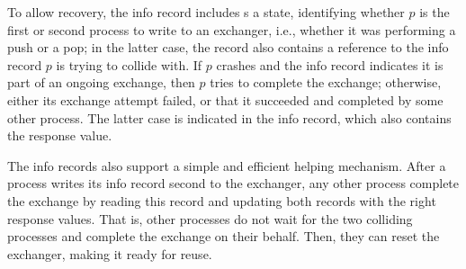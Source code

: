 To allow recovery, the info record includes s a state, identifying whether
$p$ is the first or second process to write to an exchanger,
i.e., whether it was performing a push or a pop;
in the latter case, the record also contains a reference to the info record $p$
is trying to collide with.
If $p$ crashes and the info record indicates it is part of an ongoing
exchange, then $p$ tries to complete the exchange;
otherwise, either its exchange attempt failed,
or that it succeeded and completed by some other process.
The latter case is indicated in the info record, which also contains the
response value.

The info records also support a simple and efficient helping mechanism.
After a process writes its info record second to the exchanger,
any other process complete the exchange by reading this record and
updating both records with the right response values.
That is, other processes do not wait for the two colliding processes
and complete the exchange on their behalf.
Then, they can reset the exchanger, making it ready for reuse.
